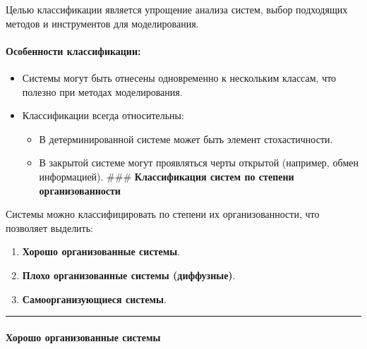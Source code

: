 \documentclass[
]{article}
\providecommand{\tightlist}{%
  \setlength{\itemsep}{0pt}\setlength{\parskip}{0pt}}
\begin{document}
Целью классификации является упрощение анализа систем, выбор подходящих
методов и инструментов для моделирования.

\paragraph{\texorpdfstring{\textbf{Особенности
классификации:}}{Особенности классификации:}}\label{ux43eux441ux43eux431ux435ux43dux43dux43eux441ux442ux438-ux43aux43bux430ux441ux441ux438ux444ux438ux43aux430ux446ux438ux438}

\begin{itemize}
\tightlist
\item
  Системы могут быть отнесены одновременно к нескольким классам, что
  полезно при методах моделирования.
\item
  Классификации всегда относительны:

  \begin{itemize}
  \tightlist
  \item
    В детерминированной системе может быть элемент стохастичности.
  \item
    В закрытой системе могут проявляться черты открытой (например, обмен
    информацией). \#\#\# \textbf{Классификация систем по степени
    организованности}
  \end{itemize}
\end{itemize}

Системы можно классифицировать по степени их организованности, что
позволяет выделить:

\begin{enumerate}
\def\labelenumi{\arabic{enumi}.}
\tightlist
\item
  \textbf{Хорошо организованные системы}.
\item
  \textbf{Плохо организованные системы (диффузные)}.
\item
  \textbf{Самоорганизующиеся системы}.
\end{enumerate}

\begin{center}\rule{0.5\linewidth}{0.5pt}\end{center}

\paragraph{\texorpdfstring{\textbf{Хорошо организованные
системы}}{Хорошо организованные системы}}\label{ux445ux43eux440ux43eux448ux43e-ux43eux440ux433ux430ux43dux438ux437ux43eux432ux430ux43dux43dux44bux435-ux441ux438ux441ux442ux435ux43cux44b}
\end{document}
